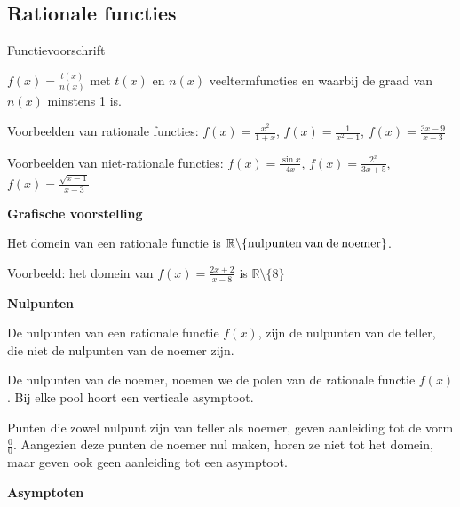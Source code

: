 \subsection{Rationale functies}

\begin{definitie}
	Functievoorschrift

${\displaystyle f(x)=\frac{t(x)}{n(x)}}$ met $t(x)$ en $n(x)$ veeltermfuncties
en waarbij de graad van $n(x)$ minstens 1 is.
\end{definitie}

\begin{voorbeeld}
Voorbeelden van rationale functies: ${\displaystyle f(x)=\frac{x^{2}}{1+x}}$,
${\displaystyle f(x)=\frac{1}{x^{2}-1}}$, ${\displaystyle f(x)=\frac{3x-9}{x-3}}$

Voorbeelden van niet-rationale functies: ${\displaystyle f(x)=\frac{\sin x}{4x}}$,
${\displaystyle f(x)=\frac{2^{x}}{3x+5}}$, ${\displaystyle f(x)=\frac{\sqrt{x-1}}{x-3}}$

\end{voorbeeld}

\textbf{Grafische voorstelling}

Het domein van een rationale functie is $\mathbb{R\setminus}\textrm{\{nulpunten\:van\:de\:noemer\}}$.

\begin{definitie}
	Voorbeeld: het domein van ${\displaystyle f(x)=\frac{2x+2}{x-8}}$
is ${\displaystyle \mathbb{R}\setminus\{8\}}$
\end{definitie}

\textbf{Nulpunten}

De nulpunten van een rationale functie $f(x)$, zijn de nulpunten
van de teller, die niet de nulpunten van de noemer zijn.

De nulpunten van de noemer, noemen we de polen van de rationale functie
$f(x)$. Bij elke pool hoort een verticale asymptoot.

Punten die zowel nulpunt zijn van teller als noemer, geven aanleiding
tot de vorm $\frac{0}{0}$. Aangezien deze punten de noemer nul maken,
horen ze niet tot het domein, maar geven ook geen aanleiding tot een
asymptoot.


\textbf{Asymptoten}

